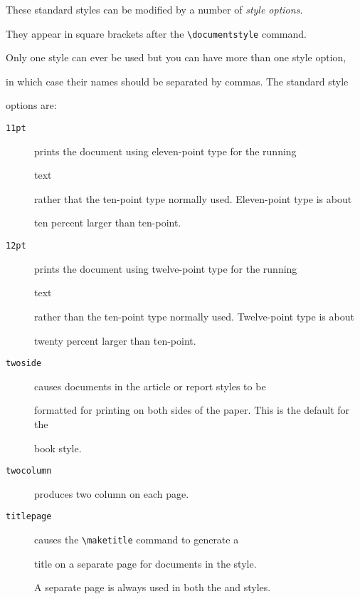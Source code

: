 These standard styles can be modified by a number of {\em style options\/}.

They appear in square brackets after the \verb|\documentstyle| command.

Only one style can ever be used but you can have more than one style option,

in which case their names should be separated by commas.  The standard style

options are:

\begin{description}



\item[{\tt 11pt}]  prints the document using eleven-point type for the running

 text

rather that the ten-point type normally used. Eleven-point type is about

ten percent larger than ten-point.



\item[{\tt 12pt}]  prints the document using twelve-point type for the running

 text

rather than the ten-point type normally used. Twelve-point type is about

twenty percent larger than ten-point.



\item[{\tt twoside}]  causes documents in the article or report styles to be

formatted for printing on both sides of the paper.  This is the default for the

book style.



\item[{\tt twocolumn}] produces two column on each page.



\item[{\tt titlepage}]  causes the \verb|\maketitle| command to generate a

title on a separate page for documents in the  style.

A separate page is always used in both the  and  styles.



\end{description}

